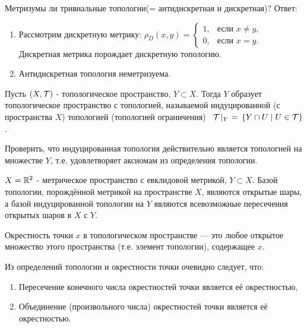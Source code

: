 \begin{exercise}
    Метризумы ли тривиальные топологии(= антидискретная и дискретная)?
    Ответ:
    \begin{enumerate}
        \item Рассмотрим дискретную метрику: $\rho_{D}(x, y) =
        \begin{cases}
            1, &\text{если $x \neq y$,} \\
            0, &\text{если $x = y$.}
        \end{cases} $
        Дискретная метрика порождает дискретную топологию.
        \item Антидискретная топология неметризуема.
    \end{enumerate}
\end{exercise}

\begin{definition}
    Пусть $(X, \mathcal{T})$ - топологическое пространство, $Y \subset X$. Тогда $Y$ образует топологическое пространство с топологией, называемой индуцированной (с пространства $X$) топологией (топологией ограничения) \ $\mathcal{T}\!\mid_{Y} \ = \, \left\{Y \cap U \mid U \in \mathcal{T}\right\}$.
\end{definition}
\begin{exercise}
    Проверить, что индуцированная топология действительно является топологией на множестве $Y$, т.е. удовлетворяет аксиомам из определения топологии.
\end{exercise}

\begin{example}
    $X = \mathbb{R}^2$ - метрическое пространство с евклидовой метрикой, $Y \subset X$. Базой топологии, порождённой метрикой на пространстве $X$, являются открытые шары, а базой индуцированной топологии на $Y$ являются всевозможные пересечения открытых шаров в $X$ с $Y$.
\end{example}

\begin{definition}
    Окрестность точки $x$ в топологическом пространстве --- это любое открытое множество этого пространства (т.е. элемент топологии), содержащее $x$.
\end{definition}

\begin{nota_bene} Из определений топологии и окрестности точки очевидно следует, что:
    \begin{enumerate}
        \item Пересечение конечного числа окрестностей точки является её окрестностью,
        \item Объединение (произвольного числа) окрестностей точки является её окрестностью.
    \end{enumerate}
\end{nota_bene}


